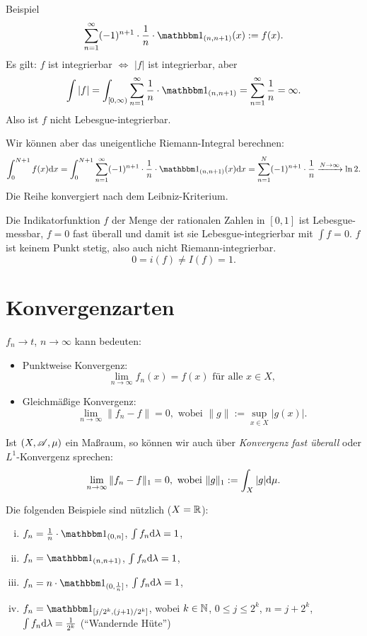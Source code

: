 \documentclass[
 a4paper,
 10pt,
 parskip=half
 ]{scrartcl}
\theoremstyle{plain}
\theoremstyle{definition}
\numberwithin{equation}{section}
\begin{document}
Beispiel
\[ \sum_{n=1}^\infty (-1)^{n+1} \cdot \rez{n} \cdot \ind_{(n,n+1)}(x) := f(x). \]
Es gilt: $f$ ist integrierbar $\Leftrightarrow$ $|f|$ ist integrierbar, aber
\[ \int |f| = \int_{[0,\infty)} \sum_{n=1}^\infty \rez{n} \cdot \ind_{(n,n+1)} = \sum_{n=1}^\infty \rez{n} = \infty. \]
Also ist $f$ nicht Lebesgue-integrierbar. 

Wir können aber das uneigentliche Riemann-Integral berechnen:
\[ \int_0^{N+1} f(x) \diffop x = \int_0^{N+1} \sum_{n=1}^\infty (-1)^{n+1} \cdot \rez{n} \cdot \ind_{(n,n+1)}(x) \diffop x = \sum_{n=1}^N (-1)^{n+1} \cdot \rez{n} \xrightarrow{N \to \infty} \ln 2. \]
Die Reihe konvergiert nach dem Leibniz-Kriterium.

Die Indikatorfunktion $f$ der Menge der rationalen Zahlen in $[0,1]$ ist Lebesgue-messbar, $f=0$ fast überall und damit ist sie Lebesgue-integrierbar mit $\int f = 0$. $f$ ist keinem Punkt stetig, also auch nicht Riemann-integrierbar.
\[ 0 = i(f) \ne I(f) = 1. \]

\section*{Konvergenzarten}
$f_n \to t$, $n \to \infty$ kann bedeuten:
\begin{itemize}
 \item Punktweise Konvergenz: 
  \[ \lim_{n \to \infty} f_n(x) = f(x) \text{ für alle } x \in X, \]
 \item Gleichmäßige Konvergenz:
  \[ \lim_{n \to \infty} \| f_n - f \| = 0, \text{ wobei } \| g \| := \sup_{x \in X} | g(x) |. \]
\end{itemize}

Ist $(X, \mathscr{A}, \mu)$ ein Maßraum, so können wir auch über \emph{Konvergenz fast überall} oder $L^1$-Konvergenz sprechen:
\[ \lim_{n \to \infty} \| f_n - f \|_1 = 0, \text{ wobei } \| g \|_1 := \int_X |g| \mathrm{d} \mu. \]

\clearpage

Die folgenden Beispiele sind nützlich ($X = \mathbb{R}$):
\begin{enumerate}[(i)]
 \item $f_n = \rez{n} \cdot \ind_{(0, n]}$, $\int f_n \mathrm{d} \lambda = 1$,
 \item $f_n = \ind_{(n,n+1)}$, $\int f_n \mathrm{d} \lambda = 1$,
 \item $f_n = n \cdot \ind_{(0,\rez{n}]}$, $\int f_n \mathrm{d} \lambda = 1$,
 \item $f_n = \ind_{[j/2^k,(j+1)/2^k]}$, wobei $k \in \mathbb{N}$, $0 \le j \le 2^k$, $n = j + 2^k$, $\int f_n \mathrm{d} \lambda = \frac{1}{2^k}$ (``Wandernde Hüte'')
\end{enumerate}
\end{document}
